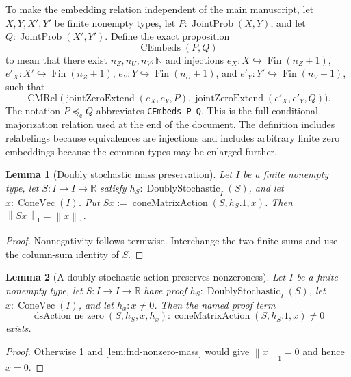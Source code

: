 \documentclass[9pt]{extarticle}
\newtheorem{lemma}{Lemma}[section]
\theoremstyle{definition}
\theoremstyle{remark}
\newcommand{\R}{\mathbb R}
\newcommand{\N}{\mathbb N}
\newcommand{\norm}[1]{\left\lVert #1\right\rVert}
\begin{document}
To make the embedding relation independent of the main manuscript, let
$X,Y,X',Y'$ be finite nonempty types, let
$P:\operatorname{JointProb}(X,Y)$, and let
$Q:\operatorname{JointProb}(X',Y')$.  Define the exact proposition
\begin{equation}
 \operatorname{CEmbeds}(P,Q)
 \label{eq:foundation-embedded-preorder}
\end{equation}
to mean that there exist $n_Z,n_U,n_V:\N$ and injections
$e_X:X\hookrightarrow\operatorname{Fin}(n_Z+1)$,
$e'_X:X'\hookrightarrow\operatorname{Fin}(n_Z+1)$,
$e_Y:Y\hookrightarrow\operatorname{Fin}(n_U+1)$, and
$e'_Y:Y'\hookrightarrow\operatorname{Fin}(n_V+1)$, such that
\[
 \operatorname{CMRel}
 \bigl(\operatorname{jointZeroExtend}(e_X,e_Y,P),
       \operatorname{jointZeroExtend}(e'_X,e'_Y,Q)\bigr).
\]
The notation $P\preccurlyeq_{\mathrm c}Q$ abbreviates
\texttt{CEmbeds P Q}.
This is the full conditional-majorization relation used at the end of the
document.  The definition includes relabelings because equivalences are
injections and includes arbitrary finite zero embeddings because the common
types may be enlarged further.

\begin{lemma}[Doubly stochastic mass preservation]
\label{lem:fnd-ds-mass}
Let $I$ be a finite nonempty type, let $S:I\to I\to\R$ satisfy
$h_S:\operatorname{DoublyStochastic}_I(S)$, and let
$x:\operatorname{ConeVec}(I)$.  Put
$Sx:=\operatorname{coneMatrixAction}(S,h_S.1,x)$.  Then
$\norm{Sx}_1=\norm{x}_1$.
\end{lemma}

\begin{proof}
Nonnegativity follows termwise.  Interchange the two finite sums and use the
column-sum identity of $S$.
\end{proof}

\begin{lemma}[A doubly stochastic action preserves nonzeroness]
\label{lem:fnd-ds-action-nonzero}
Let $I$ be a finite nonempty type, let $S:I\to I\to\R$ have proof
$h_S:\operatorname{DoublyStochastic}_I(S)$, let
$x:\operatorname{ConeVec}(I)$, and let $h_x:x\neq0$.  Then the named proof
term
\[
 \operatorname{dsAction\_ne\_zero}(S,h_S,x,h_x):
 \operatorname{coneMatrixAction}(S,h_S.1,x)\neq0
\]
exists.
\end{lemma}

\begin{proof}
Otherwise \cref{lem:fnd-ds-mass} and
\cref{lem:fnd-nonzero-mass} would give $\norm{x}_1=0$ and hence $x=0$.
\end{proof}
\end{document}
